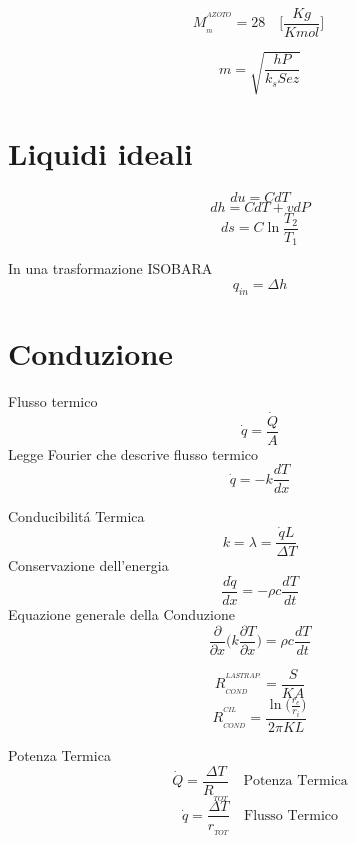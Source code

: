\documentclass[10pt,portrait,a4paper]{article}
\begin{document}
\begin{multicols}{2}
\[ M_{_{m}}^{^{AZOTO}} = 28 \quad \Big [ \frac {Kg}{Kmol} \Big ] \ \]





\[ m = \sqrt{
	\frac{hP}{k_s Sez}
}
\]



\section{Liquidi ideali}
\[
	du = CdT
	\]
\[
	dh = CdT + vdP
	\]
\[
	ds = C\ln\frac{T_2}{T_1}
	\]

	In una trasformazione ISOBARA
\[
	q_{in} = \Delta h
	\]	

\section{Conduzione}
Flusso termico
\[
	\dot{q} = \frac{\dot{Q}}{A}
	\]
Legge Fourier che descrive flusso termico
\[
	\dot{q} = -k\frac{dT}{dx}
	\]

	Conducibilitá Termica
	\[ k = \lambda = \frac{\dot{q}L}{\Delta T}\]
Conservazione dell'energia
\[
	\frac{d\dot{q}}{dx}=-\rho c\frac{dT}{dt}
	\]
Equazione generale della Conduzione
\[\frac{\partial}{\partial x}\bigg( k\frac{\partial T}{\partial x} \bigg) = \rho c \frac{dT}{dt}
\]

\[ R_{_{COND}}^{^{LASTRA P.}} =\frac{S}{KA}\]
\[ R_{_{COND}}^{^{CIL}} = \frac {\ln \Big ( \frac {r_{e}}{r_{i}} \Big )} {2 \pi KL} \]


Potenza Termica
\[ \dot{Q} =\frac{\Delta T}{R_{_{TOT}}}  \quad \textrm{Potenza Termica} \]
\[ \dot{q} =\frac{\Delta T}{r_{_{TOT}}}  \quad \textrm{Flusso Termico} \]

\end{multicols}
\end{document}
